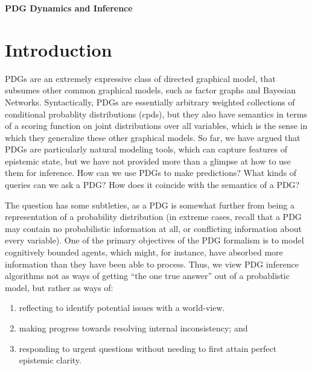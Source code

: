 \documentclass{article}
\theoremstyle{plain}
\theoremstyle{definition}
\theoremstyle{remark}
\begin{document}
\begin{center}
	{\bfseries\Large PDG Dynamics and Inference}
\end{center}	
	
\section{Introduction}

PDGs are an extremely expressive class of directed graphical model,
that subsumes other common graphical models, such as factor graphs and Bayesian Networks.
Syntactically, PDGs are essentially arbitrary weighted collections of conditional probablity distributions (cpds), but they also have semantics in terms of a scoring function on joint distributions over all variables, which is the sense in which they generalize these other graphical models.
So far, we have argued that PDGs are particularly natural modeling tools, which can capture features of epistemic state, but we have not provided more than a glimpse at how to use them for inference.
How can we use PDGs to make predictions? What kinds of queries can we ask a PDG? How does it coincide with the semantics of a PDG?

The question has some subtleties, as a PDG is somewhat further from being a representation of a probability distribution (in extreme cases, recall that a PDG may contain no probabilistic information at all, or conflicting information about every variable). 
One of the primary objectives of the PDG formalism is to model cognitively bounded agents, which might, for instance, have absorbed more information than they have been able to process.  Thus, we view PDG inference algorithms not as ways of getting ``the one true answer'' out of a probablistic model, but rather as ways of:
\begin{enumerate}[nosep]
	\item reflecting to identify potential issues with a world-view. 
	\item making progress towards resolving internal inconsistency; and
	\item responding to urgent questions without needing to first attain perfect epistemic clarity.
\end{enumerate}
\end{document}
